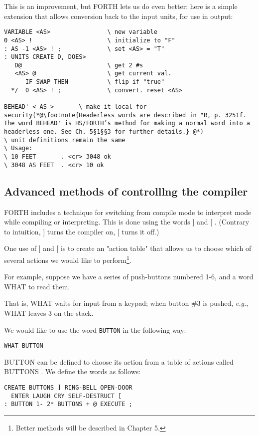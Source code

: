 This is an improvement, but FORTH lets us do even better: here is a simple extension that allows conversion back to the input units, for use in output:

\begin{lstlisting}
VARIABLE <AS>                \ new variable
0 <AS> !                     \ initialize to "F"
: AS -1 <AS> ! ;             \ set <AS> = "T"
: UNITS CREATE D, DOES>
   D@                        \ get 2 #s
   <AS> @                    \ get current val.
      IF SWAP THEN           \ flip if "true"
  */  0 <AS> ! ;             \ convert. reset <AS>

BEHEAD' < AS >       \ make it local for security(*@\footnote{Headerless words are described in "R, p. 3251f. The word BEHEAD' is HS/FORTH’s method for making a normal word into a headerless one. See Ch. 5§1§§3 for further details.} @*)
\ unit definitions remain the same
\ Usage:
\ 10 FEET       . <cr> 3048 ok
\ 3048 AS FEET  . <cr> 10 ok
\end{lstlisting}

\subsection{Advanced methods of controlllng the compiler}
FORTH includes a technique for switching from compile mode to interpret mode while compiling or interpreting. This is done using the words ] and [ . (Contrary to intuition, ] turns the
compiler on, [ turns it off.)

One use of ] and [ is to create an "action table" that allows us to choose which of several actions we would like to perform\footnote{Better methods will be described in Chapter 5.}.

For example, suppose we have a series of push-buttons numbered 1-6, and a word WHAT to read them.

That is, WHAT waits for input from a keypad; when button \#3 is pushed, \textit{e.g.}, WHAT leaves 3 on the stack.

We would like to use the word \lstinline$BUTTON$ in the following way:

\begin{lstlisting}
WHAT BUTTON
\end{lstlisting}

BUTTON can be defined to choose its action from a table of
actions called BUTTONS . We define the words as follows:

\begin{lstlisting}
CREATE BUTTONS ] RING-BELL OPEN-DOOR
  ENTER LAUGH CRY SELF-DESTRUCT [
: BUTTON 1- 2* BUTTONS + @ EXECUTE ;
\end{lstlisting}

